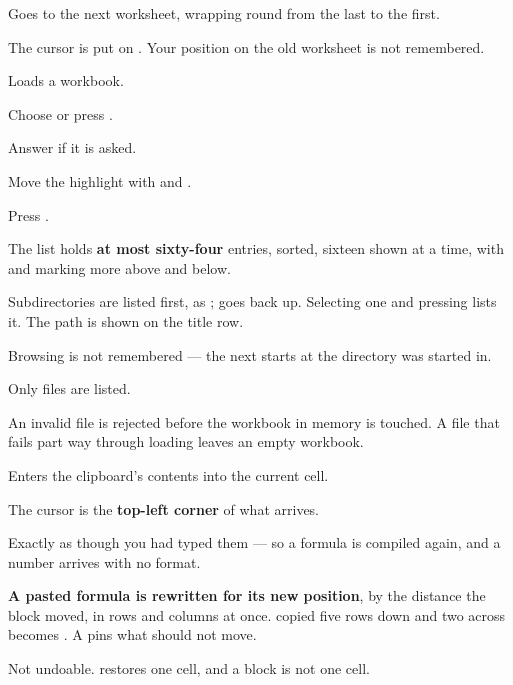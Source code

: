 
Goes to the next worksheet, wrapping round from the last to the first.

\begin{ccsteps}
\item The cursor is put on . Your position on the old worksheet is
not remembered.
\end{ccsteps}


Loads a  workbook.

\begin{ccprocedure}[]
\item Choose  or press .
\item Answer  if it is asked.
\item Move the highlight with \key{$\uparrow$} and \key{$\downarrow$}.
\item Press .
\end{ccprocedure}

\begin{ccsteps}
\item The list holds \textbf{at most sixty-four} entries, sorted, sixteen shown
at a time, with \lit{\^{}} and  marking more above and below.
\item Subdirectories are listed first, as ;  goes back up.
Selecting one and pressing  lists it. The path is shown on the
title row.
\item Browsing is not remembered --- the next  starts at the
directory \ccprod{} was started in.
\item Only  files are listed.
\item An invalid file is rejected before the workbook in memory is touched. A
file that fails part way through loading leaves an empty workbook.
\end{ccsteps}


Enters the clipboard's contents into the current cell.

\begin{ccsteps}
\item The cursor is the \textbf{top-left corner} of what arrives.
\item Exactly as though you had typed them --- so a formula is compiled again,
and a number arrives with no format.
\item \textbf{A pasted formula is rewritten for its new position}, by the
distance the block moved, in rows and columns at once.  copied five
rows down and two across becomes . A \lit{\$} pins what should not
move.
\item Not undoable.  restores one cell, and a block is not one cell.
\end{ccsteps}

